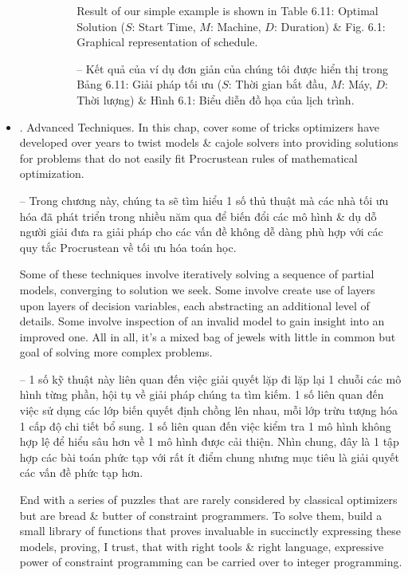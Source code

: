 \documentclass{article}
\begin{document}
\begin{itemize}
\begin{itemize}
\begin{itemize}
\begin{itemize}
                Result of our simple example is shown in {\sf Table 6.11: Optimal Solution ($S$: Start Time, $M$: Machine, $D$: Duration)} \& {\sf Fig. 6.1: Graphical representation of schedule}.

                -- Kết quả của ví dụ đơn giản của chúng tôi được hiển thị trong {\sf Bảng 6.11: Giải pháp tối ưu ($S$: Thời gian bắt đầu, $M$: Máy, $D$: Thời lượng)} \& {\sf Hình 6.1: Biểu diễn đồ họa của lịch trình}.
            \end{itemize}
        \end{itemize}
    \end{itemize}
    \item {. Advanced Techniques.} In this chap, cover some of tricks optimizers have developed over years to twist models \& cajole solvers into providing solutions for problems that do not easily fit Procrustean rules of mathematical optimization.

    -- Trong chương này, chúng ta sẽ tìm hiểu 1 số thủ thuật mà các nhà tối ưu hóa đã phát triển trong nhiều năm qua để biến đổi các mô hình \& dụ dỗ người giải đưa ra giải pháp cho các vấn đề không dễ dàng phù hợp với các quy tắc Procrustean về tối ưu hóa toán học.

    Some of these techniques involve iteratively solving a sequence of partial models, converging to solution we seek. Some involve create use of layers upon layers of decision variables, each abstracting an additional level of details. Some involve inspection of an invalid model to gain insight into an improved one. All in all, it's a mixed bag of jewels with little in common but goal of solving more complex problems.

    -- 1 số kỹ thuật này liên quan đến việc giải quyết lặp đi lặp lại 1 chuỗi các mô hình từng phần, hội tụ về giải pháp chúng ta tìm kiếm. 1 số liên quan đến việc sử dụng các lớp biến quyết định chồng lên nhau, mỗi lớp trừu tượng hóa 1 cấp độ chi tiết bổ sung. 1 số liên quan đến việc kiểm tra 1 mô hình không hợp lệ để hiểu sâu hơn về 1 mô hình được cải thiện. Nhìn chung, đây là 1 tập hợp các bài toán phức tạp với rất ít điểm chung nhưng mục tiêu là giải quyết các vấn đề phức tạp hơn.

    End with a series of puzzles that are rarely considered by classical optimizers but are bread \& butter of constraint programmers. To solve them, build a small library of functions that proves invaluable in succinctly expressing these models, proving, I trust, that with right tools \& right language, expressive power of constraint programming can be carried over to integer programming.


\end{itemize}
\end{document}
